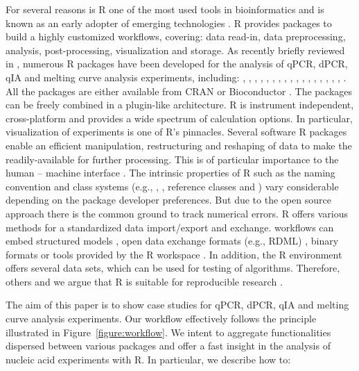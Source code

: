 For several reasons is R one of the most used tools in bioinformatics and is 
known as an early adopter of emerging technologies \citep{pabinger_2014}. R 
provides packages to build a highly customized workflows, covering: data 
read-in, data preprocessing, analysis, post-processing, visualization and 
storage. As recently briefly reviewed in \citet{pabinger_2014}, numerous R 
packages have been developed for the analysis of qPCR, dPCR, qIA and melting 
curve analysis experiments, including: , , 
, , , , 
, , , , 
, , , , 
, , , 
. All the packages are either available from CRAN or 
Bioconductor \citep{gentleman_2004}. The packages can be freely combined in a 
plugin-like architecture. R is instrument independent, cross-platform and 
provides a wide spectrum of calculation options. In particular, visualization of 
experiments is one of R's pinnacles. Several software R packages enable an 
efficient manipulation, restructuring and reshaping of data to make the 
readily-available for further processing. This is of particular importance to 
the human -- machine interface \citep{Oh_2014}. The intrinsic properties of R 
such as the naming convention \citep{Baaaath_2012} and class systems (e.g., 
, , reference classes and ) vary considerable 
depending on the package developer preferences. But due to the open source 
approach there is the common ground to track numerical errors. R offers various 
methods for a standardized data import/export and exchange. workflows can embed 
structured models \citet{Guazzelli_2009}, open data exchange formats (e.g., RDML) , binary 
formats \citep{michna_2013} or tools provided by the R workspace 
\citep{RDCT2010c}. In addition, the R environment offers several data sets, 
which can be used for testing of algorithms. Therefore, others and we argue that 
R is suitable for reproducible research \citep{Gesmann_2011, Murrell_2012, 
gandrud_2013, hofmann_2013, Leeper_2014, liu_2014}. 

The aim of this paper is to show case studies for qPCR, dPCR, qIA and melting 
curve analysis experiments. Our workflow effectively follows the principle 
illustrated in Figure~\ref{figure:workflow}. We intent to aggregate 
functionalities dispersed between various packages and offer a fast insight in 
the analysis of nucleic acid experiments with R. In particular, we describe how 
to:

